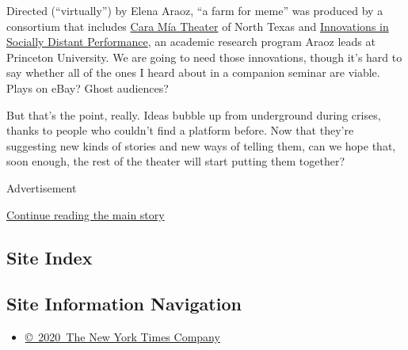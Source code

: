 Directed (``virtually'') by Elena Araoz, ``a farm for meme'' was
produced by a consortium that includes
\href{https://www.caramiatheatre.org/}{Cara Mía Theater} of North Texas
and \href{https://www.sociallydistantperformance.com/}{Innovations in
Socially Distant Performance}, an academic research program Araoz leads
at Princeton University. We are going to need those innovations, though
it's hard to say whether all of the ones I heard about in a companion
seminar are viable. Plays on eBay? Ghost audiences?

But that's the point, really. Ideas bubble up from underground during
crises, thanks to people who couldn't find a platform before. Now that
they're suggesting new kinds of stories and new ways of telling them,
can we hope that, soon enough, the rest of the theater will start
putting them together?

Advertisement

\protect\hyperlink{after-bottom}{Continue reading the main story}

\hypertarget{site-index}{%
\subsection{Site Index}\label{site-index}}

\hypertarget{site-information-navigation}{%
\subsection{Site Information
Navigation}\label{site-information-navigation}}

\begin{itemize}
\tightlist
\item
  \href{https://help.nytimes.com/hc/en-us/articles/115014792127-Copyright-notice}{©~2020~The
  New York Times Company}
\end{itemize}

